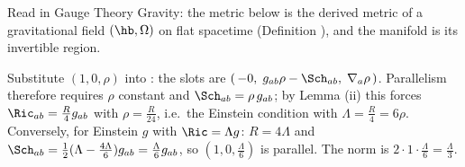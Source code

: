 Read in Gauge Theory Gravity: the metric below is the derived metric of a gravitational field $(\hb, \Omega)$ on flat spacetime (Definition ), and the manifold is its invertible region.

Substitute $(1, 0, \rho)$ into : the slots are $(\,-0,\; g_{ab}\rho - \Sch_{ab},\; \nabla_a \rho\,)$. Parallelism therefore requires $\rho$ constant and $\Sch_{ab} = \rho\, g_{ab}$; by Lemma (ii) this forces $\Ric_{ab} = \tfrac{R}{4}g_{ab}$ with $\rho = \tfrac{R}{24}$, i.e.\ the Einstein condition with $\Lambda = \tfrac{R}{4} = 6\rho$. Conversely, for Einstein $g$ with $\Ric = \Lambda g$: $R = 4\Lambda$ and $\Sch_{ab} = \tfrac12(\Lambda - \tfrac{4\Lambda}{6})g_{ab} = \tfrac{\Lambda}{6}g_{ab}$, so $(1, 0, \tfrac{\Lambda}{6})$ is parallel. The norm is $2 \cdot 1 \cdot \tfrac{\Lambda}{6} = \tfrac{\Lambda}{3}$.
